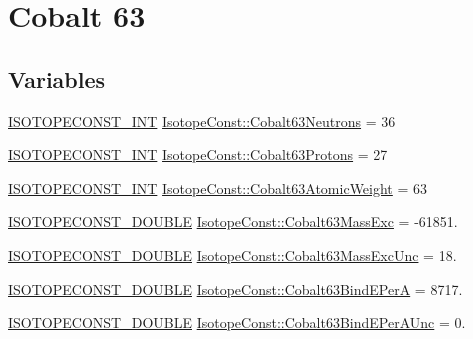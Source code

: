 \hypertarget{group___isotope_const-_cobalt-_co63}{}\section{Cobalt 63}
\label{group___isotope_const-_cobalt-_co63}
\subsection*{Variables}
\begin{DoxyCompactItemize}
\item 
\mbox{\hyperlink{group___isotope_const-_macros_ga5f18360b3e99483a35c32d789e62621c}{I\+S\+O\+T\+O\+P\+E\+C\+O\+N\+S\+T\+\_\+\+I\+NT}} \mbox{\hyperlink{group___isotope_const-_cobalt-_co63_ga770bac7c69efa0ba27ff009df215ad0d}{Isotope\+Const\+::\+Cobalt63\+Neutrons}} = 36
\item 
\mbox{\hyperlink{group___isotope_const-_macros_ga5f18360b3e99483a35c32d789e62621c}{I\+S\+O\+T\+O\+P\+E\+C\+O\+N\+S\+T\+\_\+\+I\+NT}} \mbox{\hyperlink{group___isotope_const-_cobalt-_co63_ga76947e1725e616a8b8a73e3b2cb81363}{Isotope\+Const\+::\+Cobalt63\+Protons}} = 27
\item 
\mbox{\hyperlink{group___isotope_const-_macros_ga5f18360b3e99483a35c32d789e62621c}{I\+S\+O\+T\+O\+P\+E\+C\+O\+N\+S\+T\+\_\+\+I\+NT}} \mbox{\hyperlink{group___isotope_const-_cobalt-_co63_ga9ddb8d67133d567dfda1235e64c0e6cd}{Isotope\+Const\+::\+Cobalt63\+Atomic\+Weight}} = 63
\item 
\mbox{\hyperlink{group___isotope_const-_macros_ga8f45a7272ce02c0b4c65c44636ed719a}{I\+S\+O\+T\+O\+P\+E\+C\+O\+N\+S\+T\+\_\+\+D\+O\+U\+B\+LE}} \mbox{\hyperlink{group___isotope_const-_cobalt-_co63_ga538eb966cb343bbbfe5d2d65af4da1f3}{Isotope\+Const\+::\+Cobalt63\+Mass\+Exc}} = -\/61851.
\item 
\mbox{\hyperlink{group___isotope_const-_macros_ga8f45a7272ce02c0b4c65c44636ed719a}{I\+S\+O\+T\+O\+P\+E\+C\+O\+N\+S\+T\+\_\+\+D\+O\+U\+B\+LE}} \mbox{\hyperlink{group___isotope_const-_cobalt-_co63_gae5bcd6a96f13e858f6c7b59a419ad357}{Isotope\+Const\+::\+Cobalt63\+Mass\+Exc\+Unc}} = 18.
\item 
\mbox{\hyperlink{group___isotope_const-_macros_ga8f45a7272ce02c0b4c65c44636ed719a}{I\+S\+O\+T\+O\+P\+E\+C\+O\+N\+S\+T\+\_\+\+D\+O\+U\+B\+LE}} \mbox{\hyperlink{group___isotope_const-_cobalt-_co63_gabdc7581f9dd0799ea5b3fbad3abfb58a}{Isotope\+Const\+::\+Cobalt63\+Bind\+E\+PerA}} = 8717.
\item 
\mbox{\hyperlink{group___isotope_const-_macros_ga8f45a7272ce02c0b4c65c44636ed719a}{I\+S\+O\+T\+O\+P\+E\+C\+O\+N\+S\+T\+\_\+\+D\+O\+U\+B\+LE}} \mbox{\hyperlink{group___isotope_const-_cobalt-_co63_ga51bc128c4b1ef55616e50c8d86c7003c}{Isotope\+Const\+::\+Cobalt63\+Bind\+E\+Per\+A\+Unc}} = 0.

\end{DoxyCompactItemize}
